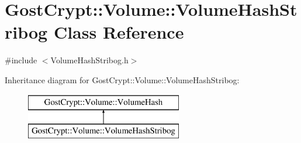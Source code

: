 \hypertarget{class_gost_crypt_1_1_volume_1_1_volume_hash_stribog}{}\section{Gost\+Crypt\+:\+:Volume\+:\+:Volume\+Hash\+Stribog Class Reference}
\label{class_gost_crypt_1_1_volume_1_1_volume_hash_stribog}


{\ttfamily \#include $<$Volume\+Hash\+Stribog.\+h$>$}

Inheritance diagram for Gost\+Crypt\+:\+:Volume\+:\+:Volume\+Hash\+Stribog\+:\begin{figure}[H]
\begin{center}
\leavevmode
\includegraphics[height=2.000000cm]{class_gost_crypt_1_1_volume_1_1_volume_hash_stribog}
\end{center}
\end{figure}
